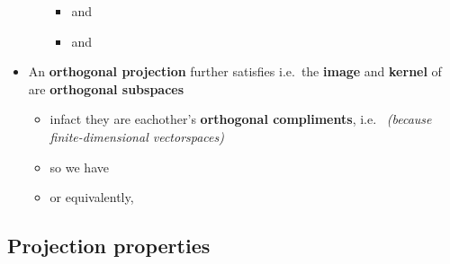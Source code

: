 \begin{itemize}
\begin{itemize}
\begin{itemize}
    \item
       and 
    \item
       and
    \end{itemize}
  \end{itemize}
\item
  An \textbf{orthogonal projection} further satisfies 
  i.e.~the \textbf{image} and \textbf{kernel} of \iMbox{\pi} are
  \textbf{orthogonal subspaces}

  \begin{itemize}
  
  \item
    infact they are eachother's \textbf{orthogonal compliments},
    i.e.~ \emph{(because
    finite-dimensional vectorspaces)}
  \item
    so we have
  \item
    or equivalently,
  \end{itemize}
\end{itemize}

\subsection*{Projection properties}

